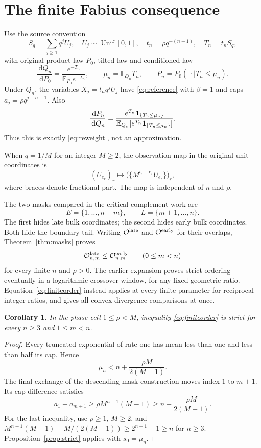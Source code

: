 \documentclass[11pt,a4paper]{article}
\newtheorem{corollary}[theorem]{Corollary}\newtheorem{proposition}[theorem]{Proposition}
\theoremstyle{remark}\newtheorem*{ednote}{Editorial note (ProveIt, 2026-10-01)}
\newcommand{\E}{\mathbb E}\newcommand{\N}{\mathbb N}\newcommand{\R}{\mathbb R}
\newcommand{\dd}{\,\mathrm d}\newcommand{\ii}{\mathrm i}
\begin{document}
\section{The finite Fabius consequence}
Use the source convention
\[
 S_q=\sum_{j\ge1}q^jU_j,\quad U_j\sim\operatorname{Unif}[0,1],\quad
 t_n=\rho q^{-(n+1)},\quad T_n=t_nS_q,
\]
with original product law $P_0$, tilted law and conditioned law
\[
 \frac{\dd Q_n}{\dd P_0}=\frac{e^{-T_n}}{\E_{P_0}e^{-T_n}},\qquad
 \mu_n=\E_{Q_n}T_n,\qquad P_n=P_0(\,\cdot\mid T_n\le\mu_n).
\]
Under $Q_n$, the variables $X_j=t_nq^jU_j$ have \eqref{eq:reference} with $\beta=1$ and caps $a_j=\rho q^{j-n-1}$. Also
\[
 \frac{\dd P_n}{\dd Q_n}
 =\frac{e^{T_n}\ind_{\{T_n\le\mu_n\}}}
        {\E_{Q_n}[e^{T_n}\ind_{\{T_n\le\mu_n\}}]}.
\]
Thus this is exactly \eqref{eq:reweight}, not an approximation.

When $q=1/M$ for an integer $M\ge2$, the observation map in the original unit coordinates is
\begin{equation}\label{eq:unitmap}
 (U_{e_r})_r\longmapsto
 \bigl(\{M^{l_r-e_r}U_{e_r}\}\bigr)_r,
\end{equation}
where braces denote fractional part. The map is independent of $n$ and $\rho$.

The two masks compared in the critical-complement work \cite{critical,second} are
\[
 E=\{1,\ldots,n-m\},\qquad L=\{m+1,\ldots,n\}.
\]
The first hides late bulk coordinates; the second hides early bulk coordinates. Both hide the boundary tail. Writing $\mathcal O^{\rm late}$ and $\mathcal O^{\rm early}$ for their overlaps, Theorem~\ref{thm:masks} proves
\begin{equation}\label{eq:finiteorder}
 \mathcal O^{\rm late}_{n,m}\le\mathcal O^{\rm early}_{n,m}
 \qquad(0\le m<n)
\end{equation}
for every finite $n$ and $\rho>0$. The earlier expansion proves strict ordering eventually in a logarithmic crossover window, for any fixed geometric ratio. Equation~\eqref{eq:finiteorder} instead applies at every finite parameter for reciprocal-integer ratios, and gives all convex-divergence comparisons at once.

\begin{corollary}\label{cor:finite-strict}
In the phase cell $1\le\rho<M$, inequality \eqref{eq:finiteorder} is strict for every $n\ge3$ and $1\le m<n$.
\end{corollary}
\begin{proof}
Every truncated exponential of rate one has mean less than one and less than half its cap. Hence
\[
 \mu_n<n+\frac{\rho M}{2(M-1)}.
\]
The final exchange of the descending mask construction moves index $1$ to $m+1$. Its cap difference satisfies
\[
 a_1-a_{m+1}\ge\rho M^{n-1}(M-1)
                    \ge n+\frac{\rho M}{2(M-1)}.
\]
For the last inequality, use $\rho\ge1$, $M\ge2$, and
$M^{n-1}(M-1)-M/(2(M-1))\ge2^{n-1}-1\ge n$ for $n\ge3$.
Proposition~\ref{prop:strict} applies with $s_0=\mu_n$.
\end{proof}
\end{document}
